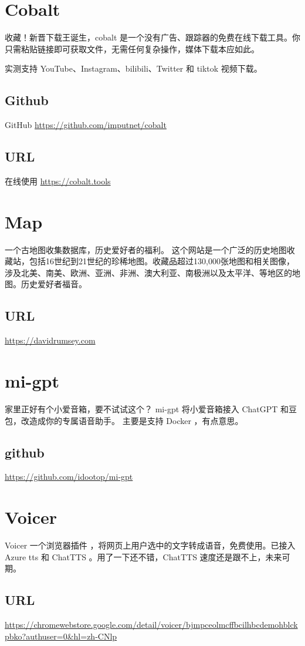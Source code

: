 \documentclass[11pt]{article}
\date{\today}
\title{}
\begin{document}
\tableofcontents

\section{Cobalt}
\label{sec:orgcceb3ec}
收藏！新晋下载王诞生，cobalt 是一个没有广告、跟踪器的免费在线下载工具。你只需粘贴链接即可获取文件，无需任何复杂操作，媒体下载本应如此。

实测支持 YouTube、Instagram、bilibili、Twitter 和 tiktok 视频下载。 
\subsection{Github}
\label{sec:orgc9927e6}
GitHub \url{https://github.com/imputnet/cobalt}
\subsection{URL}
\label{sec:orgdc5e7b3}
在线使用 \url{https://cobalt.tools}

\section{Map}
\label{sec:orgee6676e}
一个古地图收集数据库，历史爱好者的福利。
这个网站是一个广泛的历史地图收藏站，包括16世纪到21世纪的珍稀地图。收藏品超过130,000张地图和相关图像，涉及北美、南美、欧洲、亚洲、非洲、澳大利亚、南极洲以及太平洋、等地区的地图。历史爱好者福音。
\subsection{URL}
\label{sec:orgf0bbca2}
\url{https://davidrumsey.com}

\section{mi-gpt}
\label{sec:org7867beb}
家里正好有个小爱音箱，要不试试这个？
mi-gpt 将小爱音箱接入 ChatGPT 和豆包，改造成你的专属语音助手。
主要是支持 Docker ，有点意思。
\subsection{github}
\label{sec:org9443ccd}
\url{https://github.com/idootop/mi-gpt}

\section{Voicer}
\label{sec:org223a32e}
Voicer 一个浏览器插件 ，将网页上用户选中的文字转成语音，免费使用。已接入Azure tts 和 ChatTTS 。用了一下还不错，ChatTTS 速度还是跟不上，未来可期。
\subsection{URL}
\label{sec:org7c1340e}
\url{https://chromewebstore.google.com/detail/voicer/bjmpceolmcffbcilhbcdemohblckpbko?authuser=0\&hl=zh-CNlp}
\end{document}
